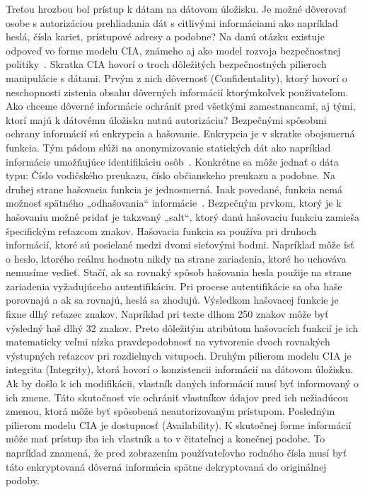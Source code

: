 Treťou hrozbou bol prístup k dátam na dátovom úložisku.
Je možné dôverovať osobe s autorizáciou prehliadania dát s citlivými informáciami ako napríklad heslá, čísla kariet, prístupové adresy a podobne?
Na danú otázku existuje odpoveď vo forme modelu CIA, známeho aj ako model rozvoja bezpečnostnej politiky~\cite{CIA}.
Skratka CIA hovorí o troch dôležitých bezpečnostných pilieroch manipulácie s dátami.
Prvým z nich dôvernosť (Confidentality), ktorý hovorí o neschopnosti zistenia obsahu dôverných informácií ktorýmkoľvek používateľom.
Ako chceme dôverné informácie ochrániť pred všetkými zamestnancami, aj tými, ktorí majú k dátovému úložisku nutnú autorizáciu?
Bezpečnými spôsobmi ochrany informácií sú enkrypcia a hašovanie.
Enkrypcia je v skratke obojsmerná funkcia.
Tým pádom slúži na anonymizovanie statických dát ako napríklad informácie umožňujúce identifikáciu osôb~\cite{Encryption}.
Konkrétne sa môže jednať o dáta typu: Číslo vodičského preukazu, číslo občianskeho preukazu a podobne.
Na druhej strane hašovacia funkcia je jednosmerná.
Inak povedané, funkcia nemá možnosť spätného „odhašovania“ informácie~\cite{Hashing}.
Bezpečným prvkom, ktorý je k hašovaniu možné pridať je takzvaný „salt“, ktorý danú hašovaciu funkciu zamieša špecifickým reťazcom znakov.
Hašovacia funkcia sa používa pri druhoch informácií, ktoré sú posielané medzi dvomi sieťovými bodmi.
Napríklad môže ísť o heslo, ktorého reálnu hodnotu nikdy na strane zariadenia, ktoré ho uchováva nemusíme vedieť.
Stačí, ak sa rovnaký spôsob hašovania hesla použije na strane zariadenia vyžadujúceho autentifikáciu.
Pri procese autentifikácie sa oba haše porovnajú a ak sa rovnajú, heslá sa zhodujú.
Výsledkom hašovacej funkcie je fixne dlhý reťazec znakov.
Napríklad pri texte dlhom 250 znakov môže byť výsledný haš dlhý 32 znakov.
Preto dôležitým atribútom hašovacích funkcií je ich matematicky veľmi nízka pravdepodobnosť na vytvorenie dvoch rovnakých
výstupných reťazcov pri rozdielnych vstupoch.
Druhým pilierom modelu CIA je integrita (Integrity), ktorá hovorí o konzistencii informácií na dátovom úložisku.
Ak by došlo k ich modifikácii, vlastník daných informácií musí byť informovaný o ich zmene.
Táto skutočnosť vie ochrániť vlastníkov údajov pred ich nežiadúcou zmenou, ktorá môže byť spôsobená neautorizovaným prístupom.
Posledným pilierom modelu CIA je dostupnosť (Availability).
K skutočnej forme informácií môže mať prístup iba ich vlastník a to v čitateľnej a konečnej podobe.
To napríklad znamená, že pred zobrazením používateľovho rodného čísla musí byť táto enkryptovaná dôverná informácia
spätne dekryptovaná do originálnej podoby.

